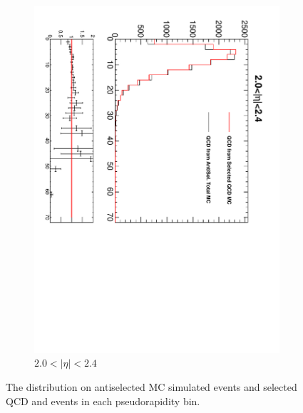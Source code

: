 \begin{figure}[htbp]
\begin{subfigure}{0.45\textwidth}
    \includegraphics*[trim = 0mm 0mm 15mm 0mm, clip, width=\textwidth, angle=90]{MetCompare_anti_eta6.pdf}
    \caption{$2.0<| \eta |<2.4$}
    \label{fig:qcd_met_eta6}
  \end{subfigure}
  \caption{The \ETm distribution on antiselected \ac{MC} simulated events and selected \ac{QCD} and \gjet events in each pseudorapidity bin.}
  \label{tab:antiselclosure}
\end{figure}


